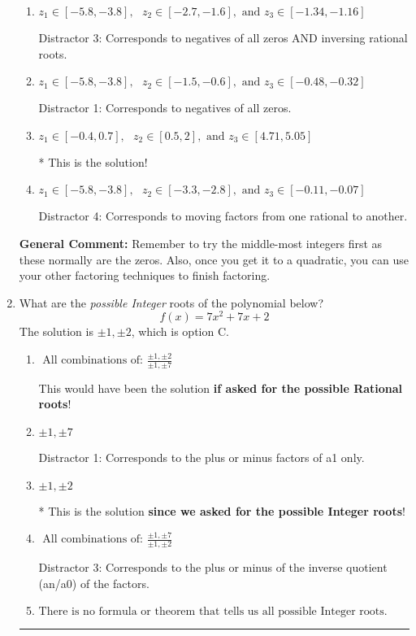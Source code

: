 \documentclass{extbook}[14pt]
\newcommand{\litem}[1]{\item #1

\rule{\textwidth}{0.4pt}}
\begin{document}
\begin{enumerate}
{\begin{enumerate}[label=\Alph*.]
 Distractor 2: Corresponds to inversing rational roots.
\item \( z_1 \in [-5.8, -3.8], \text{   }  z_2 \in [-2.7, -1.6], \text{   and   } z_3 \in [-1.34, -1.16] \)

 Distractor 3: Corresponds to negatives of all zeros AND inversing rational roots.
\item \( z_1 \in [-5.8, -3.8], \text{   }  z_2 \in [-1.5, -0.6], \text{   and   } z_3 \in [-0.48, -0.32] \)

 Distractor 1: Corresponds to negatives of all zeros.
\item \( z_1 \in [-0.4, 0.7], \text{   }  z_2 \in [0.5, 2], \text{   and   } z_3 \in [4.71, 5.05] \)

* This is the solution!
\item \( z_1 \in [-5.8, -3.8], \text{   }  z_2 \in [-3.3, -2.8], \text{   and   } z_3 \in [-0.11, -0.07] \)

 Distractor 4: Corresponds to moving factors from one rational to another.
\end{enumerate}

\textbf{General Comment:} Remember to try the middle-most integers first as these normally are the zeros. Also, once you get it to a quadratic, you can use your other factoring techniques to finish factoring.
}
\litem{
What are the \textit{possible Integer} roots of the polynomial below?
\[ f(x) = 7x^{2} +7 x + 2 \]The solution is \( \pm 1,\pm 2 \), which is option C.\begin{enumerate}[label=\Alph*.]
\item \( \text{ All combinations of: }\frac{\pm 1,\pm 2}{\pm 1,\pm 7} \)

This would have been the solution \textbf{if asked for the possible Rational roots}!
\item \( \pm 1,\pm 7 \)

 Distractor 1: Corresponds to the plus or minus factors of a1 only.
\item \( \pm 1,\pm 2 \)

* This is the solution \textbf{since we asked for the possible Integer roots}!
\item \( \text{ All combinations of: }\frac{\pm 1,\pm 7}{\pm 1,\pm 2} \)

 Distractor 3: Corresponds to the plus or minus of the inverse quotient (an/a0) of the factors. 
\item \( \text{There is no formula or theorem that tells us all possible Integer roots.} \)


\end{enumerate}}
\end{enumerate}
\end{document}
